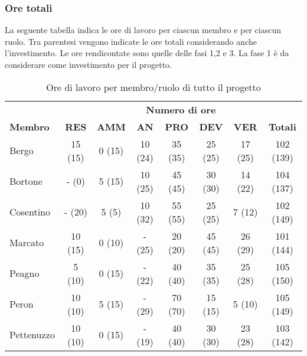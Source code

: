 	\subsubsection{Ore totali}
		La seguente tabella indica le ore di lavoro per ciascun membro e per ciascun ruolo. Tra parentesi vengono indicate le ore totali considerando anche l'investimento. Le ore rendicontate sono quelle delle fasi 1,2 e 3. La fase 1 è da considerare come investimento per il progetto.
		\begin{table}[h]
			\centering
			\begin{tabular}{| l | c c c c c c | c |}
				\rowcolor{LightBlue}
				& \multicolumn{7}{c}{\textbf{\color{white}Numero di ore}}	\\
		
				\rowcolor{LightBlue}
				\textbf{\color{white}Membro}
				& \textbf{\color{white}RES}
				& \textbf{\color{white}AMM}
				& \textbf{\color{white}AN}
				& \textbf{\color{white}PRO}
				& \textbf{\color{white}DEV}
				& \textbf{\color{white}VER}
				& \textbf{\color{white}Totali}\\
		
				Bergo 				& 15 (15) & 0 (15)		& 10 (24)	& 35 (35) & 25 (25) & 17 (25)	& 102 (139)\\
				Bortone 			& -  (0)  & 5 (15)		& 10	 (25)	& 45 (45) & 30 (30) & 14 (22)	& 104 (137)\\
				Cosentino 		& -  (20) & 5 (5)		& 10 (32)	& 55 (55) & 25 (25) & 7  (12)	& 102 (149)\\
				Marcato 			& 10 (15) & 0 (10)		& -  (25)	& 20 (20) & 45 (45) & 26 (29)	& 101 (144)\\
				Peagno 			& 5  (10) & 0 (15)		& -  (22)	& 40 (40) & 35 (35) & 25 (28)	& 105 (150)\\
				Peron 				& 10 (10) & 5 (15)		& -  (29)	& 70 (70) & 15 (15) & 5  (10)	& 105 (149)\\
				Pettenuzzo 	& 10 (10) & 0 (15) 	& -  (19)	& 40 (40) & 30 (30) & 23 (28)	& 103 (142)\\ \hline
			\end{tabular}
			\caption{Ore di lavoro per membro/ruolo di tutto il progetto}
		\end{table}
	
